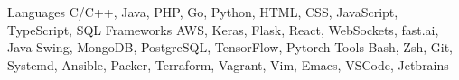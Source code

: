 
\begin{cvskills}
  \cvskill
    {Languages}
    {C/C++, Java, PHP, Go, Python, HTML, CSS, JavaScript, TypeScript, SQL}
  \cvskill
    {Frameworks}
    {AWS, Keras, Flask, React, WebSockets, fast.ai, Java Swing, MongoDB, PostgreSQL, TensorFlow, Pytorch}
  \cvskill
    {Tools}
    {Bash, Zsh, Git, Systemd, Ansible, Packer, Terraform, Vagrant, Vim, Emacs, VSCode, Jetbrains}
\end{cvskills}
